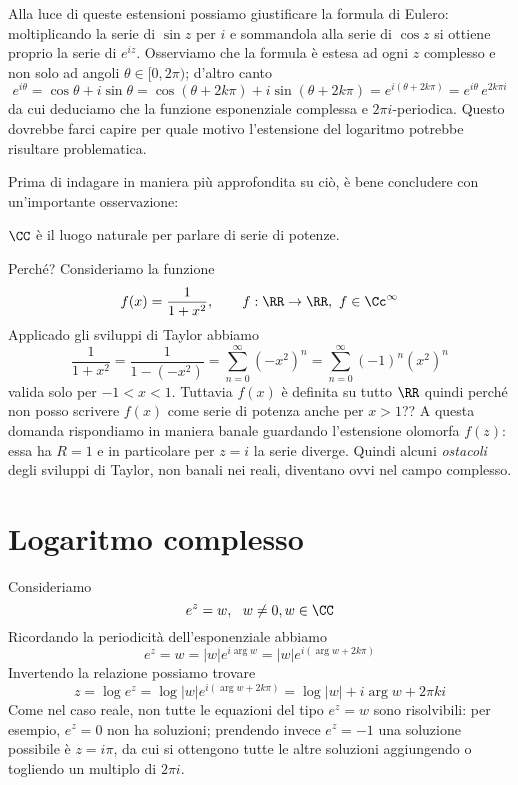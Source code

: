 Alla luce di queste estensioni possiamo giustificare la formula di Eulero: moltiplicando la serie di $\sin z$ per $i$ e sommandola alla serie di $\cos z$ si ottiene proprio la serie di $e^{iz}$. Osserviamo che la formula è estesa ad ogni $z$ complesso e non solo ad angoli $\theta\in[0,2\pi)$; d'altro canto
$$
e^{i\theta}=\cos\theta+i\sin\theta=\cos(\theta+2k\pi)+i\sin(\theta+2k\pi)=e^{i(\theta+2k\pi)}=e^{i\theta}\,e^{2k\pi i}
$$
da cui deduciamo che la funzione esponenziale complessa e $2\pi i$-periodica. Questo dovrebbe farci capire per quale motivo l'estensione del logaritmo potrebbe risultare problematica.

Prima di indagare in maniera più approfondita su ciò, è bene concludere con un'importante osservazione:
\begin{lemma}
$\CC$ è il luogo naturale per parlare di serie di potenze.
\end{lemma}
Perché? Consideriamo la funzione 
$$f(x)=\frac{1}{1+x^2}, \qquad f:\RR\to\RR,\ f\in\Cc^\infty$$
Applicado gli sviluppi di Taylor abbiamo
$$\frac{1}{1+x^2}=\frac{1}{1-(-x^2)}=\sum_{n=0}^\infty(-x^2)^n=\sum_{n=0}^\infty(-1)^n(x^2)^n$$
valida solo per $-1<x<1$. Tuttavia $f(x)$ è definita su tutto $\RR$ quindi perché non posso scrivere $f(x)$ come serie di potenza anche per $x>1$?? A questa domanda rispondiamo in maniera banale guardando l'estensione olomorfa $f(z)$: essa ha $R=1$ e in particolare per $z=i$ la serie diverge. Quindi alcuni \textit{ostacoli} degli sviluppi di Taylor, non banali nei reali, diventano ovvi nel campo complesso.


\section{Logaritmo complesso}

Consideriamo
\begin{equation*}
e^{z} = w, \ \ w\neq 0, w\in \CC
\end{equation*}
Ricordando la periodicità dell'esponenziale abbiamo
\begin{equation*}
e^{z} = w = |w| e^{i\arg w}= |w| e^{i(\arg w+2k\pi)}
\end{equation*}
Invertendo la relazione possiamo trovare
\begin{equation*}
z=\log e^z=\log |w| e^{i(\arg w+2k\pi)}=\log|w|+i\arg w+2\pi k i
\end{equation*}
Come nel caso reale, non tutte le equazioni del tipo $e^z=w$ sono risolvibili: per esempio, $e^z=0$ non ha soluzioni; prendendo invece $e^z=-1$ una soluzione possibile è $z=i\pi$, da cui si ottengono tutte le altre soluzioni aggiungendo o togliendo un multiplo di $2\pi i$.

